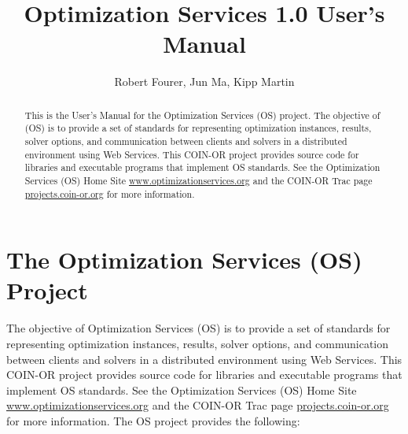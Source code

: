 \documentclass[11pt]{article}
\renewcommand{\_}{{\char"5F}}
\renewcommand{\{}{{\char"7B}}
\renewcommand{\}}{{\char"7D}}
\renewcommand{\^}{{\char"0D}}
\renewcommand{\'}{{\char"0D}}
\begin{document}
\title{Optimization Services 1.0 User's Manual }
\vskip 2in
\author{Robert Fourer, Jun Ma, Kipp Martin}
\maketitle

\begin{abstract}
This is the User's Manual for the Optimization Services (OS) project.  The objective of  (OS) is to provide a set of standards for representing optimization instances, results, solver options, and communication between clients and solvers in a distributed environment using Web Services. This COIN-OR project provides source code for libraries and executable programs that implement OS standards. See the Optimization Services (OS) Home Site \url{www.optimizationservices.org} and the COIN-OR Trac page \url{projects.coin-or.org} for more information.
\end{abstract}


\newpage
\tableofcontents
\listoffigures
\listoftables
{}



\newpage

\section{The Optimization Services (OS) Project}

The objective of Optimization Services (OS) is to provide a set of standards for representing optimization instances, results, solver options, and communication between clients and solvers in a distributed environment using Web Services. This COIN-OR project provides source code for libraries and executable programs that implement OS standards.  See the Optimization Services (OS) Home Site \url{www.optimizationservices.org} and the COIN-OR Trac page \url{projects.coin-or.org} for more information. The OS project provides the following:
\end{document}
